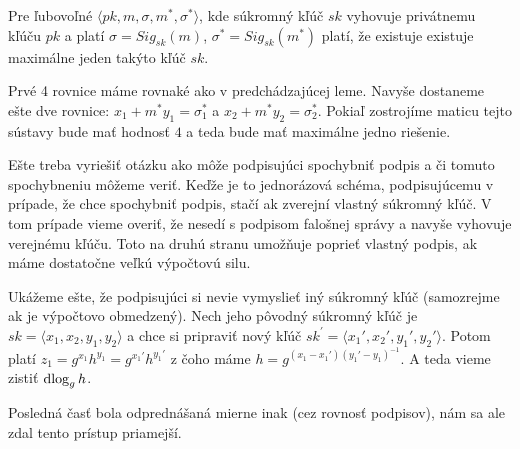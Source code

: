 \begin{lema}
    Pre ľubovoľné $\langle pk, m, \sigma, m^*, \sigma^* \rangle$, kde
    súkromný kľúč $sk$ vyhovuje privátnemu kľúču $pk$ a platí
    $\sigma = Sig_{sk}(m)$, $\sigma^* = Sig_{sk}(m^*)$ platí,
    že existuje existuje maximálne jeden takýto kľúč $sk$.
\end{lema}

\begin{dokaz}
    Prvé 4 rovnice máme rovnaké ako v predchádzajúcej leme.
    Navyše dostaneme ešte dve rovnice: $x_1 + m^*y_1 = \sigma_1^*$ a
    $x_2 + m^* y_2 = \sigma_2^*$.
    Pokiaľ zostrojíme maticu tejto sústavy bude mať hodnosť $4$ 
    a teda bude mať maximálne jedno riešenie.
\end{dokaz}


Ešte treba vyriešiť otázku ako môže podpisujúci spochybniť podpis 
a či tomuto spochybneniu môžeme veriť.
Keďže je to jednorázová schéma, podpisujúcemu v prípade,
že chce spochybniť podpis, stačí ak zverejní vlastný súkromný kľúč.
V tom prípade vieme overiť, že nesedí s podpisom falošnej správy
a navyše vyhovuje verejnému kľúču. Toto na druhú stranu
umožňuje poprieť vlastný podpis, ak máme dostatočne veľkú výpočtovú
silu.

Ukážeme ešte, že podpisujúci si nevie vymyslieť iný súkromný kľúč
(samozrejme ak je výpočtovo obmedzený). 
Nech jeho pôvodný súkromný kľúč je 
$sk = \langle x_1, x_2, y_1, y_2 \rangle$ a
chce si pripraviť nový kľúč
$sk^{'} = \langle x_1', x_2', y_1', y_2' \rangle$.
Potom platí $z_1 = g^{x_1} h^{y_1} = g^{x_1'} h^{y_1'}$ z čoho máme 
$h = g^{(x_1 - x_1')(y_1' - y_1)^{-1}}$.
A teda vieme zistiť $\operatorname{dlog}_g h$.

\begin{poznamka}
    Posledná časť bola odprednášaná mierne inak (cez rovnosť
    podpisov), nám sa ale zdal tento prístup priamejší.
\end{poznamka}
